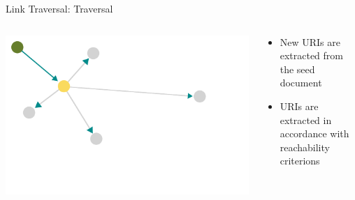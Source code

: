 \begin{frame}{Link Traversal: Traversal}
    \begin{columns}[T] %
        \begin{column}{0.6\textwidth} %
            \includegraphics[width=\linewidth]{images/showing-link-traversal-step-1.pdf} %
        \end{column}

        \begin{column}{0.4\textwidth} %
            \begin{itemize}
                \item New URIs are extracted from the seed document
                \item URIs are extracted in accordance with reachability criterions
            \end{itemize}
        \end{column}
    \end{columns}
\end{frame}


